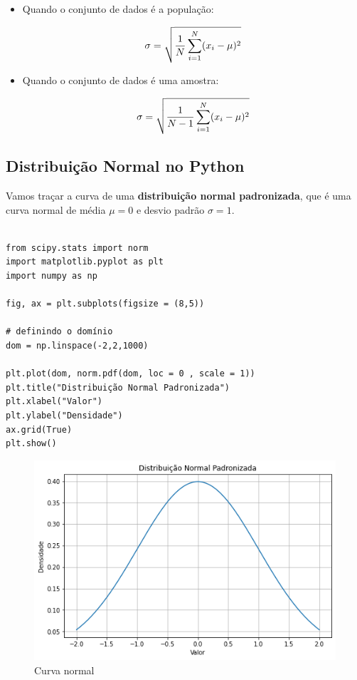 \begin{itemize}

\item Quando o conjunto de dados é a população:

\[ \large \sigma = \sqrt{\frac{1}{N}\sum_{i=1}^{N}(x_{i}-\mu )^2} \]

\item Quando o conjunto de dados é uma amostra:

\[ \large \sigma = \sqrt{\frac{1}{N-1}\sum_{i=1}^{N}(x_{i}-\mu )^2} \]

\end{itemize}

\subsection{Distribuição Normal no Python}

Vamos traçar a curva de uma \textbf{distribuição normal padronizada}, que é uma curva normal de média $\mu = 0$ e desvio padrão $\sigma = 1$.

\begin{verbatim}
	
from scipy.stats import norm
import matplotlib.pyplot as plt
import numpy as np 

fig, ax = plt.subplots(figsize = (8,5))

# definindo o domínio
dom = np.linspace(-2,2,1000)

plt.plot(dom, norm.pdf(dom, loc = 0 , scale = 1))
plt.title("Distribuição Normal Padronizada")
plt.xlabel("Valor")
plt.ylabel("Densidade")
ax.grid(True)
plt.show()

\end{verbatim}

\begin{figure}[H]
	\centering
	\includegraphics[width=1\textwidth]{./Imagens/Distribuição Normal/GA2.png} 
	\caption{Curva normal}
	\label{fig:GA2}
\end{figure}

